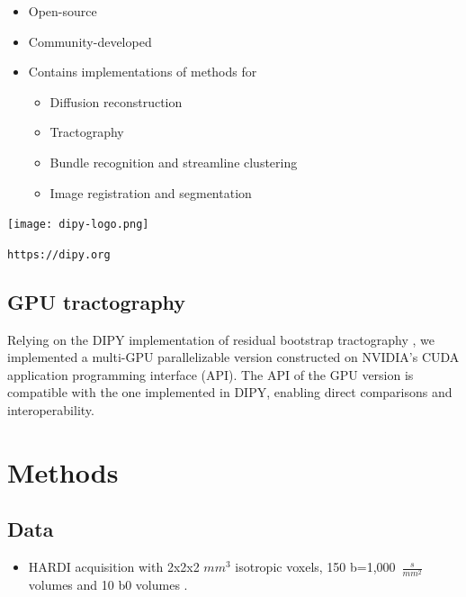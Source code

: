 \documentclass[a0, landscape]{a0poster}
\begin{document}
\begin{multicols}{3}
\begin{minipage}[b]{1\linewidth}
\begin{minipage}[b]{0.5\linewidth}
    \begin{itemize}
    \item Open-source
    \item Community-developed
    \item Contains implementations of methods for
    \begin{itemize}
        \item Diffusion reconstruction
        \item Tractography
        \item Bundle recognition and streamline clustering
        \item Image registration and segmentation
    \end{itemize}
    \end{itemize}
\end{minipage}
\begin{minipage}[b]{0.65\linewidth}
    \texttt{[image: dipy-logo.png]} \\
    \begin{centering}
    \LARGE \texttt{https://dipy.org}
    \end{centering}
\end{minipage}
\end{minipage}

\subsection*{GPU tractography}

\noindent Relying on the DIPY implementation of residual bootstrap tractography \cite{berman2008probabilistic}, we implemented a multi-GPU parallelizable version constructed on NVIDIA’s CUDA application programming interface (API).  The API of the GPU version is compatible with the one implemented in DIPY, enabling direct comparisons and interoperability.

\section*{Methods}


\subsection*{Data}
\begin{itemize}
\item HARDI acquisition with 2x2x2 $mm^3$ isotropic voxels, 150 b=1,000~$\frac{s}{mm^2}$ volumes and 10 b0 volumes \cite{rokem2015evaluating}.


\end{itemize}
\end{multicols}
\end{document}
